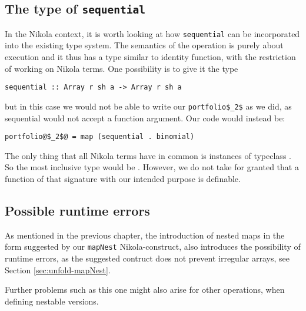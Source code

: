 \subsection{The type of \texttt{sequential}}
In the Nikola context, it is worth looking at how
\lstinline{sequential} can be incorporated into the existing type
system. The semantics of the operation is purely about execution and
it thus has a type similar to identity function, with the restriction
of working on Nikola terms. One possibility is to give it the type
\begin{lstlisting}
sequential :: Array r sh a -> Array r sh a
\end{lstlisting}
but in this case we would not be able to write our
\lstinline[mathescape]{portfolio$_2$} as we did, as sequential would
not accept a function argument. Our code would instead be:
\begin{lstlisting}
portfolio@$_2$@ = map (sequential . binomial)
\end{lstlisting}
The only thing that all Nikola terms have in common is instances of typeclass
. So the most inclusive type would be
. However, we do not take
for granted that a function of that signature with our intended purpose is
definable.


\subsection{Possible runtime errors}

As mentioned in the previous chapter, the introduction of nested maps
in the form suggested by our \lstinline{mapNest} Nikola-construct,
also introduces the possibility of runtime errors, as the suggested
contruct does not prevent irregular arrays, see Section \ref{sec:unfold-mapNest}.

Further problems such as this one might also arise for other
operations, when defining nestable versions.

